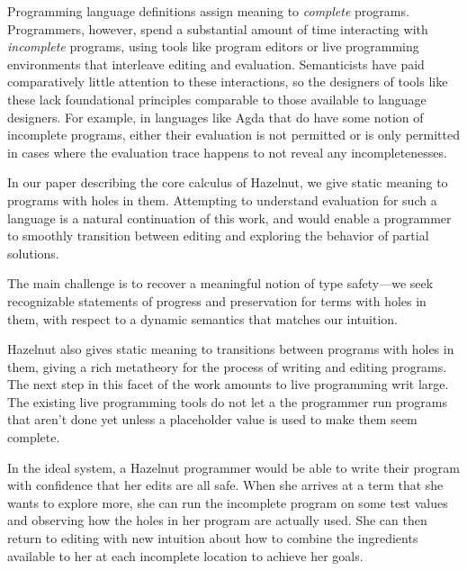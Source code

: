 Programming language definitions assign meaning to \textit{complete}
programs. Programmers, however, spend a substantial amount of time
interacting with \textit{incomplete} programs, using tools like program
editors or live programming environments that interleave editing and
evaluation. Semanticists have paid comparatively little attention to these
interactions, so the designers of tools like these lack foundational
principles comparable to those available to language designers. For
example, in languages like Agda that do have some notion of incomplete
programs, either their evaluation is not permitted or is only permitted in
cases where the evaluation trace happens to not reveal any
incompletenesses. \cite{norell:thesis}

In our paper describing the core calculus of Hazelnut, we give static
meaning to programs with holes in them.\cite{DBLP:journals/corr/OmarVHAH16}
Attempting to understand evaluation for such a language is a natural
continuation of this work, and would enable a programmer to smoothly
transition between editing and exploring the behavior of partial solutions.

The main challenge is to recover a meaningful notion of type safety---we
seek recognizable statements of progress and preservation for terms with
holes in them, with respect to a dynamic semantics that matches our
intuition.

Hazelnut also gives static meaning to transitions between programs with
holes in them, giving a rich metatheory for the process of writing and
editing programs. The next step in this facet of the work amounts to live
programming writ large. \cite{burckhardt2013s} The existing live
programming tools do not let a the programmer run programs that aren't done
yet unless a placeholder value is used to make them seem complete.

In the ideal system, a Hazelnut programmer would be able to write their
program with confidence that her edits are all safe. When she arrives at a
term that she wants to explore more, she can run the incomplete program on
some test values and observing how the holes in her program are actually
used. She can then return to editing with new intuition about how to
combine the ingredients available to her at each incomplete location to
achieve her goals.
